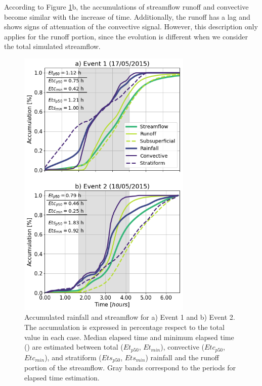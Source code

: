 \documentclass[hess, manuscript]{copernicus}
\begin{document}
According to Figure \ref{fig:lluviaElapsedCaudal}b, the accumulations of streamflow runoff and convective become similar with the increase of time.  Additionally,  the runoff has a lag and shows signs of attenuation of the convective signal.  However, this description only applies for the runoff portion, since the evolution is different when we consider the total simulated streamflow.\\


\begin{figure}[t]
\centering
 \includegraphics[width=8.3cm]{Figures/Rain_Streamflow_Elapsed.png}
 \caption{Accumulated rainfall and streamflow for a)  Event 1 and b) Event 2. The accumulation is expressed in percentage respect to the total value in each case. Median elapsed time and minimum elapsed time () are estimated between total ($Et_{p50}$, $Et_{min}$), convective ($Etc_{p50}$, $Etc_{min}$), and stratiform ($Ets_{p50}$, $Ets_{min}$) rainfall and the runoff portion of the streamflow.  Gray bands correspond to the periods for elapsed time estimation.}
    \label{fig:lluviaElapsedCaudal}
\end{figure}

\end{document}
